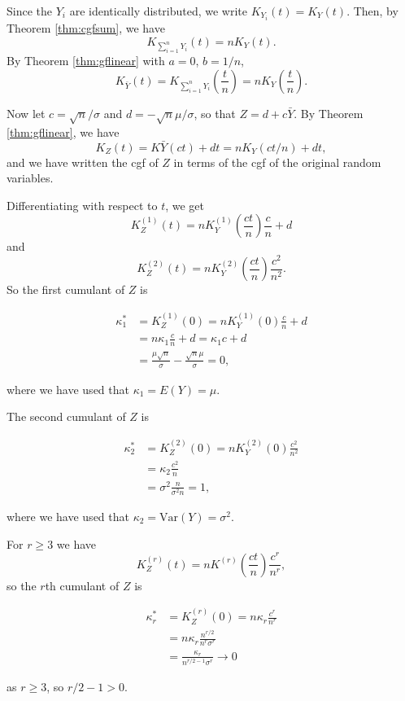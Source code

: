 \documentclass[]{book}
\theoremstyle{definition}
\theoremstyle{definition}
\theoremstyle{definition}
\theoremstyle{remark}
\begin{document}
Since the \(Y_i\) are identically distributed, we write
\(K_{Y_i}(t) = K_Y(t)\). Then, by Theorem \ref{thm:cgfsum}, we have
\[K_{\sum_{i=1}^n Y_i}(t) = n K_Y(t).\] By Theorem \ref{thm:gflinear}
with \(a =0\), \(b = 1/n\),
\[K_{\bar Y}(t) = K_{\sum_{i=1}^n Y_i}\left(\frac{t}{n}\right) 
= n K_Y\left(\frac{t}{n}\right).\]

Now let \(c = \sqrt{n} / \sigma\) and \(d = - \sqrt{n} \mu / \sigma\),
so that \(Z = d + c \bar Y\). By Theorem \ref{thm:gflinear}, we have
\[K_Z(t) = K\bar Y(ct) + dt = n K_Y(ct/n) + dt,\] and we have written
the cgf of \(Z\) in terms of the cgf of the original random variables.

Differentiating with respect to \(t\), we get
\[K_Z^{(1)}(t) = n K_Y^{(1)}\left(\frac{ct}{n}\right) \frac{c}{n} + d\]
and
\[K_Z^{(2)}(t) = n K_Y^{(2)}\left(\frac{ct}{n}\right) \frac{c^2}{n^2}.\]
So the first cumulant of \(Z\) is

\begin{align*}
\kappa_1^* &= K_Z^{(1)}(0) = n K_Y^{(1)}(0) \frac{c}{n} + d \\
& = n \kappa_1 \frac{c}{n} + d = \kappa_1 c + d \\
&= \frac{\mu \sqrt{n}}{\sigma} - \frac{\sqrt{n} \mu}{\sigma} = 0,
\end{align*}

where we have used that \(\kappa_1 = E(Y) = \mu\).

The second cumulant of \(Z\) is

\begin{align*}
\kappa_2^* &= K_Z^{(2)}(0) = n K_Y^{(2)}(0) \frac{c^2}{n^2} \\
&= \kappa_2 \frac{c^2}{n} \\
&= \sigma^2 \frac{n}{\sigma^2 n} = 1, 
\end{align*}

where we have used that \(\kappa_2 = \text{Var}(Y) = \sigma^2\).

For \(r \geq 3\) we have
\[K_Z^{(r)}(t) = n K^{(r)}\left(\frac{ct}{n}\right) \frac{c^r}{n^r},\]
so the \(r\)th cumulant of \(Z\) is

\begin{align*}
\kappa_r^* &= K_Z^{(r)}(0) = n \kappa_r \frac{c^r}{n^r} \\
&= n \kappa_r \frac{n^{r/2}}{n^r \sigma^r} \\
&= \frac{\kappa_r}{n^{r/2 - 1} \sigma^r} \rightarrow 0
\end{align*}

as \(r \geq 3\), so \(r/2 - 1 > 0\).
\end{document}

